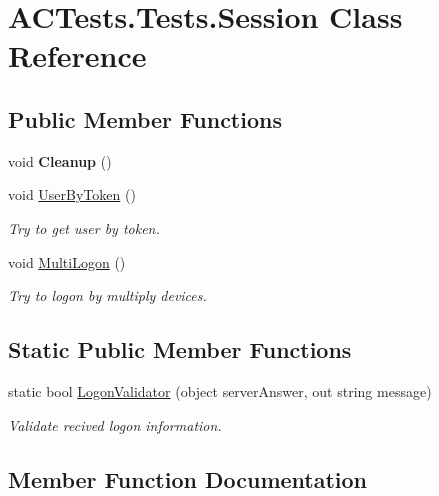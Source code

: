 \hypertarget{class_a_c_tests_1_1_tests_1_1_session}{}\section{A\+C\+Tests.\+Tests.\+Session Class Reference}
\label{class_a_c_tests_1_1_tests_1_1_session}
\subsection*{Public Member Functions}
\begin{DoxyCompactItemize}
\item 
\mbox{\label{class_a_c_tests_1_1_tests_1_1_session_ad618f7d308b38b0899d491090ee2c146}} 
void {\bfseries Cleanup} ()
\item 
void \mbox{\hyperlink{class_a_c_tests_1_1_tests_1_1_session_a973fe8f58c877ca9f382869fec5c9d6d}{User\+By\+Token}} ()
\begin{DoxyCompactList}\small\item\em Try to get user by token. \end{DoxyCompactList}\item 
void \mbox{\hyperlink{class_a_c_tests_1_1_tests_1_1_session_a5a734ff8b5aa87833325f944d7efa379}{Multi\+Logon}} ()
\begin{DoxyCompactList}\small\item\em Try to logon by multiply devices. \end{DoxyCompactList}\end{DoxyCompactItemize}
\subsection*{Static Public Member Functions}
\begin{DoxyCompactItemize}
\item 
static bool \mbox{\hyperlink{class_a_c_tests_1_1_tests_1_1_session_a3d906e7e948738c5f5491103dc44a003}{Logon\+Validator}} (object server\+Answer, out string message)
\begin{DoxyCompactList}\small\item\em Validate recived logon information. \end{DoxyCompactList}\end{DoxyCompactItemize}


\subsection{Member Function Documentation}
\mbox{\label{class_a_c_tests_1_1_tests_1_1_session_a3d906e7e948738c5f5491103dc44a003}} 
